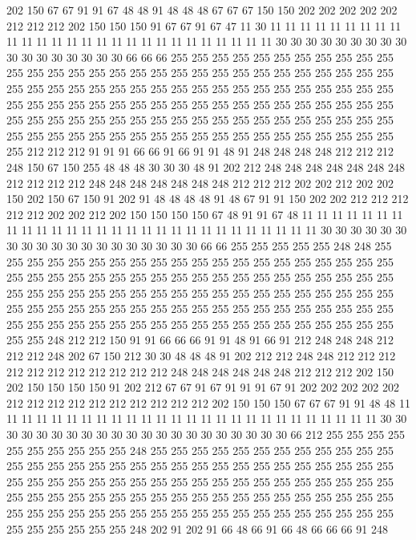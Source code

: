 202 150 67 67 91 91 67 48 48 91 48 48 48 67 67 67 150 150 202 202
202 202 202 212 212 212 202 150 150 150 91 67 67 91 67 47 11 30 11 11
11 11 11 11 11 11 11 11 11 11 11 11 11 11 11 11 11 11 11 11
11 11 11 11 11 30 30 30 30 30 30 30 30 30 30 30 30 30 30 30
30 30 66 66 66 255 255 255 255 255 255 255 255 255 255 255 255 255 255 255
255 255 255 255 255 255 255 255 255 255 255 255 255 255 255 255 255 255 255 255
255 255 255 255 255 255 255 255 255 255 255 255 255 255 255 255 255 255 255 255
255 255 255 255 255 255 255 255 255 255 255 255 255 255 255 255 255 255 255 255
255 255 255 255 255 255 255 255 255 255 255 255 255 255 255 255 255 255 255 255
255 255 255 255 255 255 255 255 255 255 255 255 212 212 212 91 91 91 66 66
91 66 91 91 48 91 248 248 248 248 212 212 212 248 150 67 150 255 48 48
48 30 30 30 48 91 202 212 248 248 248 248 248 248 248 212 212 212 212 248
248 248 248 248 248 248 212 212 212 202 202 212 202 202 150 202 150 67 150 91
202 91 48 48 48 48 91 48 67 91 91 150 202 202 212 212 212 212 212 202
202 212 202 150 150 150 150 67 48 91 91 67 48 11 11 11 11 11 11 11
11 11 11 11 11 11 11 11 11 11 11 11 11 11 11 11 11 11 11 11
11 30 30 30 30 30 30 30 30 30 30 30 30 30 30 30 30 30 30 30
66 66 255 255 255 255 255 248 248 255 255 255 255 255 255 255 255 255 255 255
255 255 255 255 255 255 255 255 255 255 255 255 255 255 255 255 255 255 255 255
255 255 255 255 255 255 255 255 255 255 255 255 255 255 255 255 255 255 255 255
255 255 255 255 255 255 255 255 255 255 255 255 255 255 255 255 255 255 255 255
255 255 255 255 255 255 255 255 255 255 255 255 255 255 255 255 255 255 255 255
255 255 255 255 255 255 255 248 212 212 150 91 91 66 66 66 91 91 48 91
66 91 212 248 248 248 212 212 212 248 202 67 150 212 30 30 48 48 48 91
202 212 212 248 248 212 212 212 212 212 212 212 212 212 212 212 248 248 248 248
248 248 212 212 212 202 150 202 150 150 150 150 91 202 212 67 67 91 67 91
91 91 67 91 202 202 202 202 202 212 212 212 212 212 212 212 212 212 212 202
150 150 150 67 67 67 91 91 48 48 11 11 11 11 11 11 11 11 11 11
11 11 11 11 11 11 11 11 11 11 11 11 11 11 11 11 30 30 30 30
30 30 30 30 30 30 30 30 30 30 30 30 30 30 30 30 30 66 212 255
255 255 255 255 255 255 255 255 255 248 255 255 255 255 255 255 255 255 255 255
255 255 255 255 255 255 255 255 255 255 255 255 255 255 255 255 255 255 255 255
255 255 255 255 255 255 255 255 255 255 255 255 255 255 255 255 255 255 255 255
255 255 255 255 255 255 255 255 255 255 255 255 255 255 255 255 255 255 255 255
255 255 255 255 255 255 255 255 255 255 255 255 255 255 255 255 255 255 255 255
255 255 255 255 248 202 91 202 91 66 48 66 91 66 48 66 66 66 91 248

